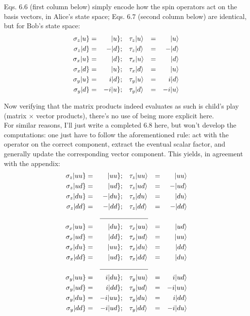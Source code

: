 \documentclass[solutions.tex]{subfiles}
\begin{document}
Eqs. $6.6$ (first column below) simply encode how the spin operators
act on the basis vectors, in Alice's state space; Eqs. $6.7$
(second column below) are identical, but for Bob's state space:
\begin{equation*}\begin{aligned}
	\sigma_z|u\} &=&|u\}; &&& \tau_z|u\rangle &=&& |u\rangle \\
	\sigma_z|d\} &=&-|d\}; &&& \tau_z|d\rangle &=&& -|d\rangle \\
	\sigma_x|u\} &=&|d\}; &&& \tau_x|u\rangle &=&& |d\rangle \\
	\sigma_x|d\} &=&|u\}; &&& \tau_x|d\rangle &=&& |u\rangle \\
	\sigma_y|u\} &=&i|d\}; &&& \tau_y|u\rangle &=&& i|d\rangle \\
	\sigma_y|d\} &=&-i|u\}; &&& \tau_y|d\rangle &=&& -i|u\rangle \\
\end{aligned}\end{equation*}

Now verifying that the matrix products indeed evaluates as such is
child's play (matrix $\times$ vector products), there's no use
of being more explicit here. \\

For similar reasons, I'll just write a completed $6.8$ here, but won't
develop the computations: one just have to follow the aforementioned
rule: act with the operator on the correct component, extract the eventual
scalar factor, and generally update the corresponding vector component.
This yields, in agreement with the appendix:
\begin{equation*}\begin{aligned}
	\sigma_z\keit{uu} &=&\keit{uu};  &&& \tau_z\ket{uu} &=&& \ket{uu} \\
	\sigma_z\keit{ud} &=&\keit{ud};  &&& \tau_z\ket{ud} &=&& -\ket{ud} \\
	\sigma_z\keit{du} &=&-\keit{du}; &&& \tau_z\ket{du} &=&& \ket{du} \\
	\sigma_z\keit{dd} &=&-\keit{dd}; &&& \tau_z\ket{dd} &=&& -\ket{dd} \\
	 \cline{3-6}
	\sigma_x\keit{uu} &=&\keit{du}; &&& \tau_x\ket{uu} &=&& \ket{ud} \\
	\sigma_x\keit{ud} &=&\keit{dd}; &&& \tau_x\ket{ud} &=&& \ket{uu} \\
	\sigma_x\keit{du} &=&\keit{uu}; &&& \tau_x\ket{du} &=&& \ket{dd} \\
	\sigma_x\keit{dd} &=&\keit{ud}; &&& \tau_x\ket{dd} &=&& \ket{du} \\
	 \cline{3-6}
	\sigma_y\keit{uu} &=&i\keit{du};  &&& \tau_y\ket{uu} &=&& i\ket{ud} \\
	\sigma_y\keit{ud} &=&i\keit{dd};  &&& \tau_y\ket{ud} &=&& -i\ket{uu} \\
	\sigma_y\keit{du} &=&-i\keit{uu}; &&& \tau_y\ket{du} &=&& i\ket{dd} \\
	\sigma_y\keit{dd} &=&-i\keit{ud}; &&& \tau_y\ket{dd} &=&& -i\ket{du} \\
\end{aligned}\end{equation*}
\end{document}
